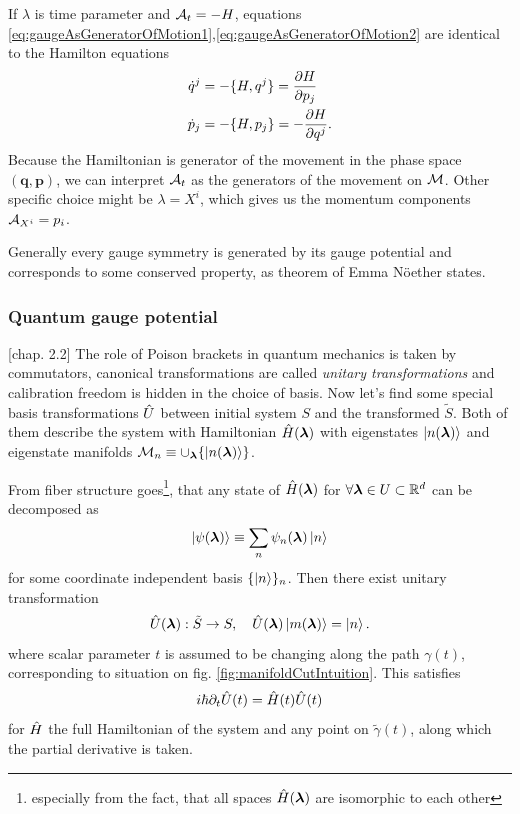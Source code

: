 If $\lambda$ is time parameter and $\mathcal{A}_t=-H$, equations \ref{eq:gaugeAsGeneratorOfMotion1},\ref{eq:gaugeAsGeneratorOfMotion2} are identical to the Hamilton equations
\begin{equation}
\begin{split}
    \dot{q}^j&=-\{H,q^j\} = \frac{\partial H}{\partial p_j}\\
    \dot{p}_j&=-\{H,p_j\} = -\frac{\partial H}{\partial q^j}.
\end{split}
\end{equation}
Because the Hamiltonian is generator of the movement in the phase space $(\bm{q},\bm{p})$, we can interpret $\mathcal{A}_t$ as the generators of the movement on $\mathcal{M}$. Other specific choice might be $\lambda=X^i$, which gives us the momentum components $\mathcal{A}_{X^i}=p_i$.

Generally every gauge symmetry is generated by its gauge potential and corresponds to some conserved property, as theorem of Emma Nöether states.





\subsubsection{Quantum gauge potential}
\citep{kolodrubez}[chap. 2.2]
The role of Poison brackets in quantum mechanics is taken by commutators, canonical transformations are called \emph{unitary transformations} and calibration freedom is hidden in the choice of basis. Now let's find some special basis transformations $\hat{U}$ between initial system $S$ and the transformed $\tilde{S}$. Both of them describe the system with Hamiltonian $\hat{H}({\bm\lambda})$ with eigenstates $\ket{n({\bm\lambda})}$ and eigenstate manifolds $\mathcal{M}_n\equiv \cup_{\bm\lambda} \{\ket{n({\bm\lambda})}\}$. 

From fiber structure goes\footnote{especially from the fact, that all spaces $\hat{H}({\bm\lambda})$ are isomorphic to each other}, that any state of $\hat{H}({\bm\lambda})$ for $\forall {\bm\lambda}\in U\subset \mathbb{R}^d$ can be decomposed as
    \begin{equation}
    \ket{\psi({\bm\lambda})}\equiv \sum_n \psi_n({\bm\lambda})\ket{n}
\end{equation}    
for some coordinate independent basis $\{\ket{n}\}_n$.
Then there exist unitary transformation
\begin{equation}
    \hat{U}({\bm\lambda}): \tilde S\rightarrow S,\quad \hat{U}({\bm\lambda})\ket{m({\bm\lambda})}=\ket{n}.
    \label{eq:transformationU}
\end{equation}
where scalar parameter $t$ is assumed to be changing along the path $\gamma(t)$, corresponding to situation on fig. \ref{fig:manifoldCutIntuition}. This satisfies
\begin{equation}
    i\hbar \partial_t \hat{U}(t)=\hat{H}(t)\hat{U}(t)
    \label{eq:schrodingerForU}
\end{equation}
for $\hat{H}$ the full Hamiltonian of the system and any point on $\tilde\gamma(t)$, along which the partial derivative is taken.


